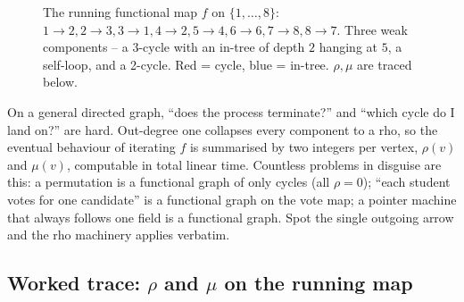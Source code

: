 \begin{figure}[H]
\centering
{}
\caption{The running functional map \(f\) on \(\{1,\dots,8\}\):
\(1{\to}2,2{\to}3,3{\to}1,4{\to}2,5{\to}4,6{\to}6,7{\to}8,8{\to}7\).  Three weak
components -- a 3-cycle with an in-tree of depth \(2\) hanging at \(5\), a self-loop,
and a 2-cycle.  Red = cycle, blue = in-tree.  \(\rho,\mu\) are traced below.}
\label{fig:c31-func}
\end{figure}

\begin{insightbox}
On a general directed graph, ``does the process terminate?'' and ``which cycle do I
land on?'' are hard.  Out-degree one collapses every component to a rho, so the
eventual behaviour of iterating \(f\) is summarised by two integers per vertex,
\(\rho(v)\) and \(\mu(v)\), computable in total linear time.  Countless problems in
disguise are this: a permutation is a functional graph of only cycles (all
\(\rho=0\)); ``each student votes for one candidate'' is a functional graph on the
vote map; a pointer machine that always follows one field is a functional graph.
Spot the single outgoing arrow and the rho machinery applies verbatim.
\end{insightbox}

\subsection{Worked trace: \(\rho\) and \(\mu\) on the running map}

